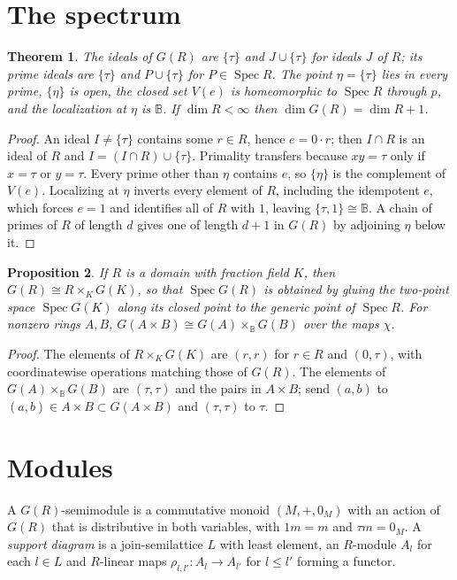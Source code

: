 \documentclass[11pt]{amsart}
\newtheorem{theorem}{Theorem}[section]
\newtheorem{proposition}[theorem]{Proposition}
\theoremstyle{remark}\newtheorem{remark}[theorem]{Remark}
\newcommand{\B}{\mathbb B}
\begin{document}
\section{The spectrum}
\begin{theorem}\label{spec}
The ideals of $G(R)$ are $\{\tau\}$ and $J\cup\{\tau\}$ for ideals $J$ of $R$; its prime ideals are $\{\tau\}$ and
$P\cup\{\tau\}$ for $P\in\operatorname{Spec}R$. The point $\eta=\{\tau\}$ lies in every prime, $\{\eta\}$ is open, the
closed set $V(e)$ is homeomorphic to $\operatorname{Spec}R$ through $p$, and the localization at $\eta$ is $\B$. If
$\dim R<\infty$ then $\dim G(R)=\dim R+1$.
\end{theorem}
\begin{proof}
An ideal $I\neq\{\tau\}$ contains some $r\in R$, hence $e=0\cdot r$; then $I\cap R$ is an ideal of $R$ and
$I=(I\cap R)\cup\{\tau\}$. Primality transfers because $xy=\tau$ only if $x=\tau$ or $y=\tau$. Every prime other than
$\eta$ contains $e$, so $\{\eta\}$ is the complement of $V(e)$. Localizing at $\eta$ inverts every element of $R$,
including the idempotent $e$, which forces $e=1$ and identifies all of $R$ with $1$, leaving $\{\tau,1\}\cong\B$.
A chain of primes of $R$ of length $d$ gives one of length $d+1$ in $G(R)$ by adjoining $\eta$ below it.
\end{proof}

\begin{proposition}\label{glue}
If $R$ is a domain with fraction field $K$, then $G(R)\cong R\times_K G(K)$, so that $\operatorname{Spec}G(R)$ is
obtained by gluing the two-point space $\operatorname{Spec}G(K)$ along its closed point to the generic point of
$\operatorname{Spec}R$. For nonzero rings $A,B$, $G(A\times B)\cong G(A)\times_{\B}G(B)$ over the maps $\chi$.
\end{proposition}
\begin{proof}
The elements of $R\times_K G(K)$ are $(r,r)$ for $r\in R$ and $(0,\tau)$, with coordinatewise operations matching
those of $G(R)$. The elements of $G(A)\times_\B G(B)$ are $(\tau,\tau)$ and the pairs in $A\times B$; send $(a,b)$ to
$(a,b)\in A\times B\subset G(A\times B)$ and $(\tau,\tau)$ to $\tau$.
\end{proof}

\section{Modules}
A $G(R)$-semimodule is a commutative monoid $(M,+,0_M)$ with an action of $G(R)$ that is distributive in both
variables, with $1m=m$ and $\tau m=0_M$. A \emph{support diagram} is a join-semilattice $L$ with least element, an
$R$-module $A_l$ for each $l\in L$ and $R$-linear maps $\rho_{l,l'}\colon A_l\to A_{l'}$ for $l\le l'$ forming a functor.
\end{document}
